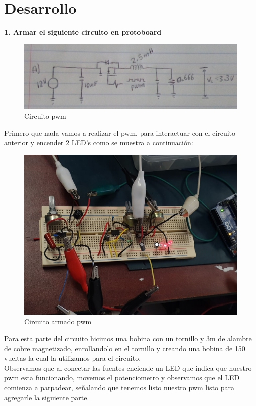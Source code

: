 \documentclass[10pt,a4paper]{article}
\begin{document}
\newpage
\section{Desarrollo}
\textbf{1. Armar el siguiente circuito en protoboard}
\begin{figure}[hbtp]
\centering
\includegraphics[scale=0.5]{Pictures/Circuito A.jpeg}
\caption{Circuito pwm}
\end{figure}

Primero que nada vamos a realizar el pwm, para interactuar con el circuito anterior y encender 2 LED's como se muestra a continuación: 
\begin{figure}[hbtp]
\centering
\includegraphics[scale=0.3]{Pictures/Pwm.jpeg}
\caption{Circuito armado pwm}
\end{figure}

Para esta parte del circuito hicimos una bobina con un tornillo y 3m de alambre de cobre magnetizado, enrollandolo en el tornillo y creando una bobina de 150 vueltas la cual la utilizamos para el circuito.\\
Observamos que al conectar las fuentes enciende un LED que indica que nuestro pwm esta funcionando, movemos el potenciometro y observamos que el LED comienza a parpadear, señalando que tenemos listo nuestro pwm listo para agregarle la siguiente parte.\\
\end{document}
